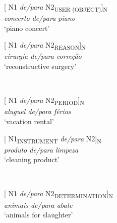 \documentclass[output=paper]{langsci/langscibook}
\begin{document}
\begin{minipage}{0.4\textwidth}    %
[ N1 \textit{de/para} N2\textsubscript{USER (OBJECT)}]\textsubscript{N}\\
\textit{concerto de/para piano}\\
`piano concert'
\end{minipage}
\hfill            %
\begin{minipage}{0.4\textwidth}
[ N1 \textit{de/para} N2\textsubscript{REASON}]\textsubscript{N}\\
\textit{cirurgia de/para correção}\\
`reconstructive surgery'
\end{minipage} \\
\hfill
\vspace{0.5cm}

\begin{minipage}{0.4\textwidth}
[ N1 \textit{de/para} N2\textsubscript{PERIOD}]\textsubscript{N}\\
\textit{aluguel de/para férias}\\
`vacation rental'
\end{minipage} 
\hfill
\begin{minipage}{0.4\textwidth}
[ N1\textsubscript{INSTRUMENT} \textit{de/para} N2]\textsubscript{N}\\
\textit{produto de/para limpeza}\\
`cleaning product'
\end{minipage} \\
\hfill
\vspace{0.5cm}

\begin{minipage}{0.4\textwidth}
[ N1 \textit{de/para} N2\textsubscript{DETERMINATION}]\textsubscript{N}\\
\textit{animais de/para abate}\\
`animals for slaughter'
\end{minipage} 
\end{document}
